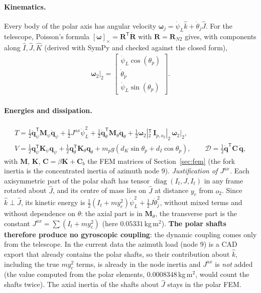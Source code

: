 \documentclass[10pt,a4paper]{article}
\numberwithin{equation}{section}
\begin{document}
\paragraph{Kinematics.} Every body of the polar axis has angular velocity $\boldsymbol\omega_j = \dot\psi_L\hat k + \dot\theta_j\hat J$. For the telescope, Poisson's formula $[\boldsymbol\omega]_\times = \mathbf R^{\mathsf T}\dot{\mathbf R}$ with $\mathbf R = \mathbf R_{N2}$ gives, with components along $\hat I, \hat J, \hat K$ (derived with SymPy and checked against the closed form),
\begin{gather}
\boldsymbol\omega_2\big|_2 = \left[\begin{matrix}\dot{\psi}_L \cos{\left(\theta_{p} \right)}\\\dot{\theta}_p\\\dot{\psi}_L \sin{\left(\theta_{p} \right)}\end{matrix}\right].
\end{gather}
\paragraph{Energies and dissipation.}
\begin{gather}
T = \tfrac12\dot{\mathbf q}_\psi^{\mathsf T}\mathbf M_{\psi}\dot{\mathbf q}_\psi + \tfrac12 J^{ax}\dot\psi_L^2 + \tfrac12\dot{\mathbf q}_\theta^{\mathsf T}\mathbf M_{\theta}\dot{\mathbf q}_\theta + \tfrac12\boldsymbol\omega_2|_2^{\mathsf T}\,\mathbf I_{p,o_2}|_2\,\boldsymbol\omega_2|_2, \\
V = \tfrac12\mathbf q_\psi^{\mathsf T}\mathbf K_{\psi}\mathbf q_\psi + \tfrac12\mathbf q_\theta^{\mathsf T}\mathbf K_{\theta}\mathbf q_\theta + m_p g\left(d_K\sin\theta_p + d_I\cos\theta_p\right),\qquad \mathcal D = \tfrac12\dot{\mathbf q}^{\mathsf T}\mathbf C\,\dot{\mathbf q},
\end{gather}
with $\mathbf M$, $\mathbf K$, $\mathbf C = \beta\mathbf K + \mathbf C_b$ the FEM matrices of Section~\ref{sec:fem} (the fork inertia is the concentrated inertia of azimuth node 9).
\emph{Justification of $J^{ax}$.} Each axisymmetric part of the polar shaft has tensor $\operatorname{diag}(I_t, J, I_t)$ in any frame rotated about $\hat J$, and its centre of mass lies on $\hat J$ at distance $y_c$ from $o_2$. Since $\hat k\perp\hat J$, its kinetic energy is $\tfrac12(I_t + m y_c^2)\dot\psi_L^2 + \tfrac12 J\dot\theta_j^2$, without mixed terms and without dependence on $\theta$: the axial part is in $\mathbf M_\theta$, the transverse part is the constant $J^{ax} = \sum(I_t + m y_c^2)$ (here $0.05331$\,kg\,m$^2$). \textbf{The polar shafts therefore produce no gyroscopic coupling}: the dynamic coupling comes only from the telescope. In the current data the azimuth load (node 9) is a CAD export that already contains the polar shafts, so their contribution about $\hat k$, including the true $m y_c^2$ terms, is already in the node inertia and $J^{ax}$ is \emph{not} added (the value computed from the polar elements, $0.0008348$\,kg\,m$^2$, would count the shafts twice). The axial inertia of the shafts about $\hat J$ stays in the polar FEM.
\end{document}
